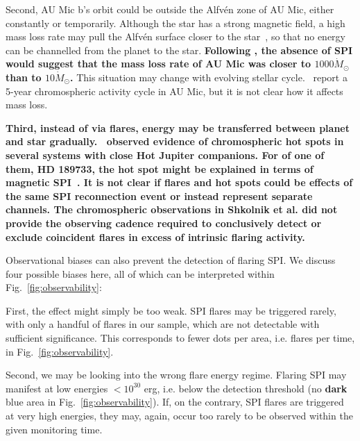 \documentclass[fleqn,usenatbib]{mnras}%
\begin{document}
Second, AU Mic b's orbit could be outside the Alfv\'en zone of AU Mic, either constantly or temporarily. Although the star has a strong magnetic field, a high mass loss rate may pull the Alfv\'en surface closer to the star~\citep{kavanagh2021}, so that no energy can be channelled from the planet to the star. \textbf{Following \citet{kavanagh2021}, the absence of SPI would suggest that the mass loss rate of AU Mic was closer to $1000\dot{M}_\odot$ than to $10\dot{M}_\odot$.} This situation may change with evolving stellar cycle.~\citet{ibanezbustos2019first} report a 5-year chromospheric activity cycle in AU Mic, but it is not clear how it affects mass loss.

\textbf{Third, instead of via flares, energy may be transferred between planet and star gradually.~\citet{shkolnik2003evidence, shkolnik2005hot, shkolnik2008nature} observed evidence of chromospheric hot spots in several systems with close Hot Jupiter companions. For of one of them, HD 189733, the hot spot might be explained in terms of magnetic SPI~\citep{cohen2011dynamics,lanza2012starplanet}. It is not clear if flares and hot spots could be effects of the same SPI reconnection event or instead represent separate channels. The chromospheric observations in Shkolnik et al. did not provide the observing cadence required to conclusively detect or exclude coincident flares in excess of intrinsic flaring activity.}

Observational biases can also prevent the detection of flaring SPI. We discuss four possible biases here, all of which can be interpreted within Fig.~\ref{fig:observability}:

First, the effect might simply be too weak. SPI flares may be triggered rarely, with only a handful of flares in our sample, which are not detectable with sufficient significance. This corresponds to fewer dots per area, i.e. flares per time, in Fig.~\ref{fig:observability}.

Second, we may be looking into the wrong flare energy regime. Flaring SPI may manifest at low energies $<10^{30}$ erg, i.e. below the detection threshold (no \textbf{dark} blue area in Fig.~\ref{fig:observability}). If, on the contrary, SPI flares are triggered at very high energies, they may, again, occur too rarely to be observed within the given monitoring time. 
\end{document}
